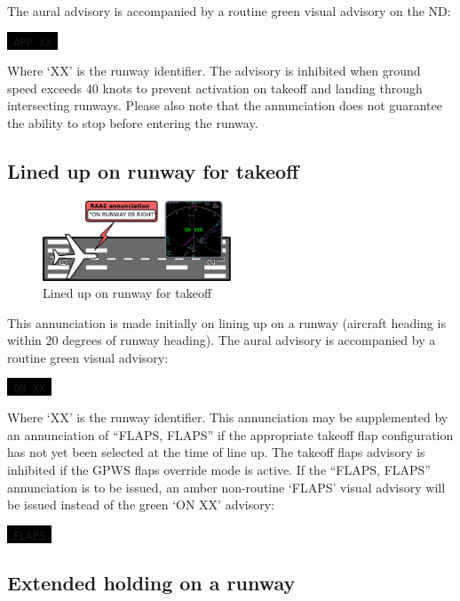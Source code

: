 \documentclass[a4paper,12pt]{article}
\newcommand{\visualadvisory}[3][b]{%
    \ifthenelse{\equal{#1}{b}}{\begin{center}}{}
    \noindent
    \colorbox{black}{\textcolor{#2visualadvisorycolor}{\large\texttt{~#3~}}}
    \ifthenelse{\equal{#1}{b}}{\end{center}}{}}
\begin{document}
\noindent The aural advisory is accompanied by a routine green visual
advisory on the ND:

\visualadvisory{routine}{APP XX}

\noindent Where `XX' is the runway identifier. The advisory is inhibited
when ground speed exceeds 40 knots to prevent activation on takeoff and
landing through intersecting runways. Please also note that the
annunciation does not guarantee the ability to stop before entering the
runway.

\newpage

\subsection{Lined up on runway for takeoff}
\label{subsec:OnRwyMon}

\begin{figure}
\begin{center}
\includegraphics[width=0.5\textwidth]{../src/on_rwy.pdf}
\end{center}
\caption{Lined up on runway for takeoff}
\end{figure}

This annunciation is made initially on lining up on a runway (aircraft
heading is within 20 degrees of runway heading).  The aural advisory is
accompanied by a routine green visual advisory:

\visualadvisory{routine}{ON XX}

\noindent Where `XX' is the runway identifier. This annunciation may be
supplemented by an annunciation of ``FLAPS, FLAPS'' if the appropriate
takeoff flap configuration has not yet been selected at the time of line
up. The takeoff flaps advisory is inhibited if the GPWS flaps override
mode is active. If the ``FLAPS, FLAPS'' annunciation is to be issued, an
amber non-routine `FLAPS' visual advisory will be issued instead of the
green `ON XX' advisory:

\visualadvisory{nonroutine}{FLAPS}

\subsection{Extended holding on a runway}
\label{subsec:ExtHoldingMon}
\end{document}
